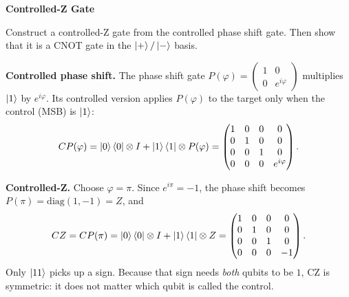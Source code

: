 \documentclass[a4paper, 10pt]{article}
\begin{document}
\begin{problem}
\textbf{Controlled-Z Gate}
\par Construct a controlled-Z gate from the controlled phase shift gate.
Then show that it is a CNOT gate in the \( \ket{+}/\ket{-} \) basis.
\end{problem}

\begin{solution}
	\noindent \textbf{Controlled phase shift.} The phase shift gate \( P(\varphi) = \begin{pmatrix} 1 & 0 \\ 0 & e^{i\varphi} \end{pmatrix} \) multiplies \( \ket{1} \) by \( e^{i\varphi} \).
	Its controlled version applies \( P(\varphi) \) to the target only when the control (MSB) is \( \ket{1} \):
	\[
		CP(\varphi)
		= \ket{0}\bra{0} \otimes I + \ket{1}\bra{1} \otimes P(\varphi)
		= \begin{pmatrix}
			1 & 0 & 0 & 0            \\
			0 & 1 & 0 & 0            \\
			0 & 0 & 1 & 0            \\
			0 & 0 & 0 & e^{i\varphi}
		\end{pmatrix}.
	\]

	\noindent \textbf{Controlled-Z.} Choose \( \varphi = \pi \). Since \( e^{i\pi} = -1 \), the phase shift becomes \( P(\pi) = \mathrm{diag}(1, -1) = Z \), and
	\[
		CZ = CP(\pi)
		= \ket{0}\bra{0} \otimes I + \ket{1}\bra{1} \otimes Z
		= \begin{pmatrix}
			1 & 0 & 0 & 0  \\
			0 & 1 & 0 & 0  \\
			0 & 0 & 1 & 0  \\
			0 & 0 & 0 & -1
		\end{pmatrix}.
	\]
	Only \( \ket{11} \) picks up a sign. Because that sign needs \emph{both} qubits to be \( 1 \), CZ is symmetric: it does not matter which qubit is called the control.


\end{solution}
\end{document}
